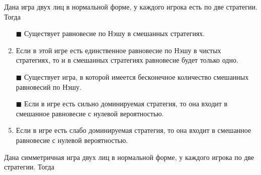 \task
Дана игра двух лиц в нормальной форме, у каждого игрока есть по две стратегии. Тогда
\begin{enumerate}[label=$\square$]	%
	\item[$\blacksquare$] Существует равновесие по Нэшу в смешанных стратегиях.
	\item Если в этой игре есть единственное равновесие по Нэшу в чистых стратегиях, то и в смешанных стратегиях равновесие будет только одно.
	\item[$\blacksquare$] Существует игра, в которой имеется бесконечное количество смешанных равновесий по Нэшу.
	\item[$\blacksquare$] Если в игре есть сильно доминируемая стратегия, то она входит в смешанное равновесие с нулевой вероятностью.
	\item Если в игре есть слабо доминируемая стратегия, то она входит в смешанное равновесие с нулевой вероятностью.
\end{enumerate}

\task
Дана симметричная игра двух лиц в нормальной форме, у каждого игрока по две стратегии. Тогда

